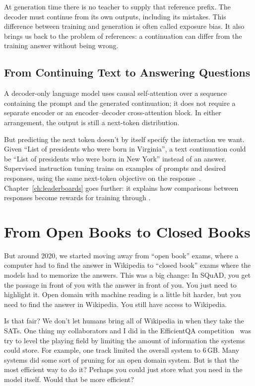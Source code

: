 At generation time there is no teacher to supply that reference prefix.  The decoder must continue from its own outputs, including its mistakes.  This difference between training and generation is often called exposure bias.  It also brings us back to the problem of references: a continuation can differ from the training answer without being wrong.

\subsection{From Continuing Text to Answering Questions}

A decoder-only language model uses causal self-attention over a sequence containing the prompt and the generated continuation; it does not require a separate encoder or an encoder--decoder cross-attention block.  In either arrangement, the output is still a next-token distribution.

But predicting the next token doesn't by itself specify the interaction we want.  Given ``List of presidents who were born in Virginia'', a text continuation could be ``List of presidents who were born in New York'' instead of an answer.  Supervised instruction tuning trains on examples of prompts and desired responses, using the same next-token objective on the response~\citep{ouyang-22}.  Chapter~\ref{ch:leaderboards} goes further: it explains how comparisons between responses become rewards for training through .

\section{From Open Books to Closed Books}
\label{sec:methods:generation}
But around 2020, we started moving away from ``open book'' exams, where a computer had to find the answer in Wikipedia to ``closed book'' exams where the models had to memorize the answers.  This was a big change: In SQuAD, you get the passage in front of you with the answer in front of you.  You just need to highlight it.  Open domain  with machine reading is a little bit harder, but you need to find the answer in Wikipedia.  You still have access to Wikipedia.

Is that fair?  We don't let humans bring all of Wikipedia in when they take the SATs.  One thing my collaborators and I did in the EfficientQA competition~\citep{min2021efficientqa} was try to level the playing field by limiting the amount of information the systems could store.  For example, one track limited the overall system to 6\,GB.  Many systems did some sort of pruning for an open domain  system.  But is that the most efficient way to do it?  Perhaps you could just store what you need in the model itself.  Would that be more efficient?

